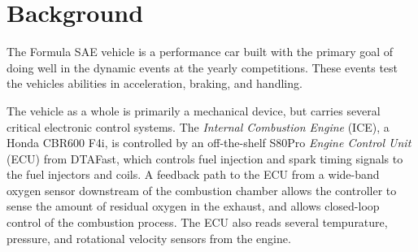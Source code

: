 %
%
%
%

\section{Background}


The Formula SAE vehicle is a performance car built with the primary goal of
doing well in the dynamic events at the yearly competitions. These events test
the vehicles abilities in acceleration, braking, and handling.

The vehicle as a whole is primarily a mechanical device, but
carries several critical electronic control systems. The \emph{Internal
Combustion Engine} (ICE),
a Honda CBR600 F4i, is controlled by an off-the-shelf S80Pro \emph{Engine
Control Unit} (ECU) from DTAFast\cite{s60pro}, which
controls
fuel injection and spark timing signals to the fuel injectors and
coils. A feedback path to the ECU from a wide-band oxygen sensor downstream
of the combustion chamber allows the controller to sense the amount
of residual oxygen in the exhaust, and allows closed-loop control of
the combustion process. The ECU also reads several tempurature, pressure,
and rotational velocity sensors from the engine.
